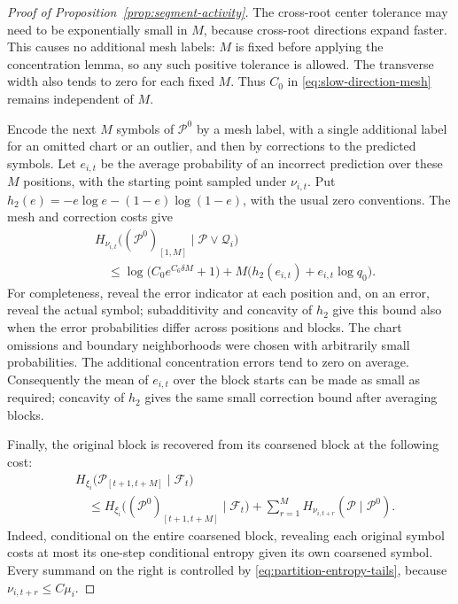 \begin{proof}[Proof of Proposition~\ref{prop:segment-activity}]
The cross-root center tolerance may need to be exponentially small in
$M$, because cross-root directions expand faster.  This causes no
additional mesh labels: $M$ is fixed before applying the concentration
lemma, so any such positive tolerance is allowed.  The transverse width
also tends to zero for each fixed $M$.  Thus $C_0$ in
\eqref{eq:slow-direction-mesh} remains independent of $M$.

Encode the next $M$ symbols of $\mathcal P^0$ by a mesh label, with a
single additional label for an omitted chart or an outlier, and then by
corrections to the predicted symbols.  Let $e_{i,t}$ be the average
probability of an incorrect prediction over these $M$ positions, with
the starting point sampled under $\nu_{i,t}$.  Put
$h_2(e)=-e\log e-(1-e)\log(1-e)$, with the usual zero conventions.
The mesh and correction costs give
\begin{equation}\label{eq:mesh-correction-entropy}
 \begin{aligned}
 &H_{\nu_{i,t}}\bigl((\mathcal P^0)_{[1,M]}
                    \mid\mathcal P\vee\mathcal Q_i\bigr)\\
 &\quad\leq\log\bigl(C_0e^{C_6\delta M}+1\bigr)
       +M\bigl(h_2(e_{i,t})+e_{i,t}\log q_0\bigr).
 \end{aligned}
\end{equation}
For completeness, reveal the error indicator at each position and, on an
error, reveal the actual symbol; subadditivity and concavity of $h_2$
give this bound also when the error probabilities differ across positions
and blocks.  The chart omissions and boundary neighborhoods were chosen
with arbitrarily small probabilities.  The additional concentration
errors tend to zero on average.  Consequently the mean of $e_{i,t}$
over the block starts can be made as small as required; concavity of
$h_2$ gives the same small correction bound after averaging blocks.

Finally, the original block is recovered from its coarsened block at
the following cost:
\begin{equation}\label{eq:restore-block-entropy}
 \begin{aligned}
 &H_{\xi_i}\bigl(\mathcal P_{[t+1,t+M]}\mid\mathcal F_t\bigr)\\
 &\quad\leq
 H_{\xi_i}\bigl((\mathcal P^0)_{[t+1,t+M]}\mid\mathcal F_t\bigr)
 +\sum_{r=1}^M H_{\nu_{i,t+r}}(\mathcal P\mid\mathcal P^0).
 \end{aligned}
\end{equation}
Indeed, conditional on the entire coarsened block, revealing each
original symbol costs at most its one-step conditional entropy given
its own coarsened symbol.  Every summand on the right is controlled by
\eqref{eq:partition-entropy-tails}, because
$\nu_{i,t+r}\leq C\mu_i$.


\end{proof}
